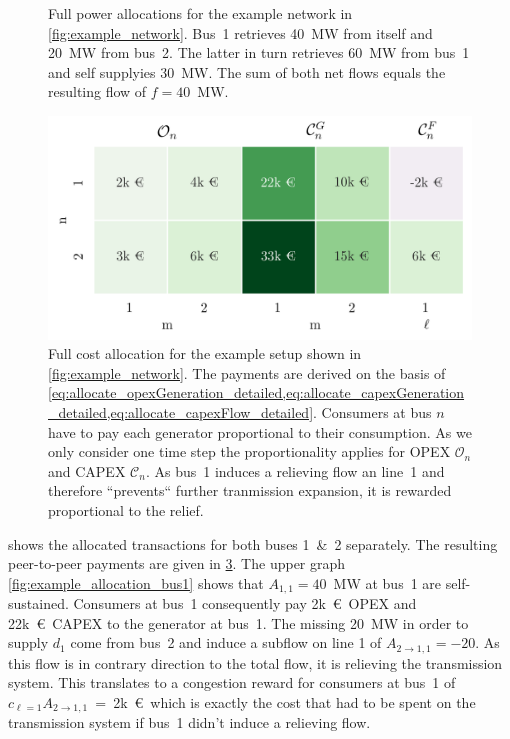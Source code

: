 \documentclass[11pt,twocolumn]{article}
\begin{document}
\begin{figure}[h!]
\begin{subfigure}[c]{\linewidth}
       \vspace{-30pt}
       \label{fig:example_allocation_bus2}
    \end{subfigure}
	\caption{Full power allocations for the example network in \cref{fig:example_network}. Bus~1 retrieves 40~MW from itself and 20~MW from bus~2. The latter in turn retrieves 60~MW from bus~1 and self supplyies 30~MW. The sum of both net flows equals the resulting flow of $f=40$~MW.}
	\label{fig:example_allocation}
\end{figure}
\begin{figure}[h]
\centering
 \includegraphics[width=\linewidth]{example_payoff.png}
 \caption{Full cost allocation for the example setup shown in \cref{fig:example_network}. The payments are derived on the basis of \cref{eq:allocate_opexGeneration_detailed,eq:allocate_capexGeneration_detailed,eq:allocate_capexFlow_detailed}. Consumers at bus $n$ have to pay each generator proportional to their consumption. As we only consider one time step the proportionality applies for OPEX $\mathcal{O}_n$ and CAPEX $\mathcal{C}_n$. As bus~1 induces a relieving flow an line~1 and therefore ``prevents`` further tranmission expansion, it is rewarded proportional to the relief.}
 \label{fig:example_payoff}
\end{figure}
 shows the allocated transactions for both buses 1~\&~2 separately. The resulting peer-to-peer payments are given in \cref{fig:example_payoff}.
The upper graph \cref{fig:example_allocation_bus1} shows that $A_{1,1}=40$~MW at bus~1 are self-sustained. Consumers at bus~1 consequently pay 2k~\euro~OPEX and 22k~\euro~CAPEX to the generator at bus~1. The missing 20~MW in order to supply $d_1$ come from bus~2 and induce a subflow on line 1 of $A_{2 \rightarrow 1, 1} = -20$. As this flow is in contrary direction to the total flow, it is relieving the transmission system. This translates to a congestion reward for consumers at bus~1 of $c_{\ell=1} A_{2 \rightarrow 1, 1}$~=~2k~\euro\, which is exactly the cost that had to be spent on the transmission system if bus~1 didn't induce a relieving flow. 
\end{document}
